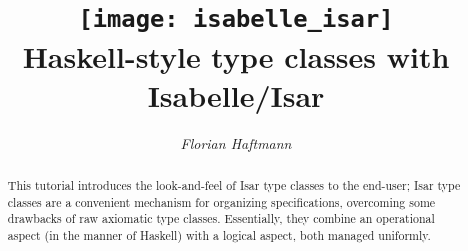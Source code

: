 \documentclass[12pt,a4paper,fleqn]{report}
\title{\texttt{[image: isabelle\_isar]}
  \\[4ex] Haskell-style type classes with Isabelle/Isar}
\author{\emph{Florian Haftmann}}
\begin{document}
\maketitle

\begin{abstract}
  This tutorial introduces the look-and-feel of Isar type classes
  to the end-user; Isar type classes are a convenient mechanism
  for organizing specifications, overcoming some drawbacks
  of raw axiomatic type classes. Essentially, they combine
  an operational aspect (in the manner of Haskell) with
  a logical aspect, both managed uniformly.
\end{abstract}

\thispagestyle{empty}\clearpage

\clearfirst



\begingroup
 \small\raggedright\frenchspacing

\endgroup
\end{document}
